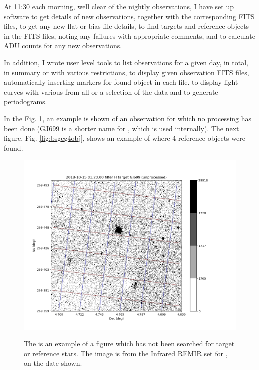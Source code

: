At 11:30 each morning, well clear of the nightly observations, I have set up software to get details of new observations,
together with the corresponding FITS files, to get any new flat or bias file details, to find targets and reference
objects in the FITS files, noting any failures with appropriate comments, and to calculate ADU counts for any new
observations.

In addition, I wrote user level tools to list observations for a given day, in total, in summary or with various
restrictions, to display given observation FITS files, automatically inserting markers for found object in each file. to
display light curves with various from all or a selection of the data and to generate periodograms.

In the Fig. \ref{fig:bsheg}, an example is shown of an observation for which no processing has been done (GJ699 is a
shorter name for \bstar, which is used internally). The next figure, Fig. \ref{fig:bsgeg4obj}, shows an example of where 4 reference objects were found.

\begin{figure}[!htbp]
\begin{center}
\includegraphics[scale=0.5]{images/bsheg.png} \\
\end{center}   
\caption{The is an example of a figure which has not been searched for target or reference stars. The image is from the Infrared REMIR set for \bstar, on the date shown.}
  \protect\label{fig:bsheg}
\end{figure}

